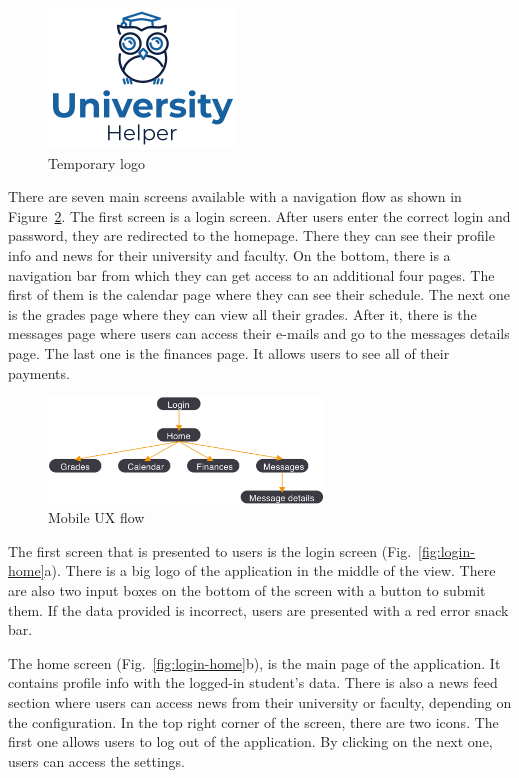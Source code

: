 \begin{figure}[htb]
    \centering
    \includegraphics[scale=.9]{fig03/logo.png}
    \caption{Temporary logo}
    \label{fig:app-logo}
\end{figure}

There are seven main screens available with a navigation flow as shown in Figure~\ref{fig:ux-flow}. The first screen is a login screen. After users enter the correct login and password, they are redirected to the homepage. There they can see their profile info and news for their university and faculty. On the bottom, there is a navigation bar from which they can get access to an additional four pages. The first of them is the calendar page where they can see their schedule. The next one is the grades page where they can view all their grades. After it, there is the messages page where users can access their e-mails and go to the messages details page. The last one is the finances page. It allows users to see all of their payments.

\begin{figure}[htb]
    \centering
    \includegraphics[width=0.65\textwidth]{fig03/mobile_ux_flow.png}
    \caption{Mobile UX flow}
    \label{fig:ux-flow}
\end{figure}

The first screen that is presented to users is the login screen (Fig.~\ref{fig:login-home}a). There is a big logo of the application in the middle of the view. There are also two input boxes on the bottom of the screen with a button to submit them. If the data provided is incorrect, users are presented with a red error snack bar.

The home screen (Fig.~\ref{fig:login-home}b), is the main page of the application. It contains profile info with the logged-in student's data. There is also a news feed section where users can access news from their university or faculty, depending on the configuration. In the top right corner of the screen, there are two icons. The first one allows users to log out of the application. By clicking on the next one, users can access the settings.

